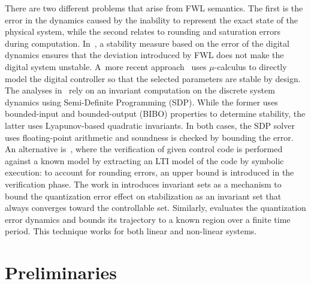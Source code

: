 \documentclass[twocolumn]{autart}    %
\renewcommand{\note}[1]{\textcolor{red}{[#1]}}
\begin{document}
There are two different problems that arise from FWL semantics.  The first
is the error in the dynamics caused by the inability to represent the exact
state of the physical system, while the second relates to rounding and
saturation errors during computation.  In~\cite{fialho1994stability}, a
stability measure based on the error of the digital dynamics ensures that
the deviation introduced by FWL does not make the digital system unstable. 
A~more recent approach~\cite{DBLP:journals/automatica/WuLCC09} uses
$\mu$-calculus to directly model the digital controller so that the selected
parameters are stable by design.  The analyses
in~\cite{DBLP:conf/hybrid/RouxJG15, DBLP:conf/hybrid/WangGRJF16} rely on an
invariant computation on the discrete system dynamics using Semi-Definite
Programming (SDP).  While the former uses bounded-input and bounded-output
(BIBO) properties to determine stability, the latter uses Lyapunov-based
quadratic invariants.  In both cases, the SDP solver uses floating-point
arithmetic and soundness is checked by bounding the error.  An alternative
is~\cite{park2016scalable}, where the verification of given control code is
performed against a known model by extracting an LTI model of the code by
symbolic execution: to account for rounding errors, an upper bound is
introduced in the verification phase.  The work in
\cite{picasso2003stabilization} introduces invariant sets as a mechanism to
bound the quantization error effect on stabilization as an invariant set
that always converges toward the controllable set.  Similarly,
\cite{liberzon2003hybrid} evaluates the quantization error dynamics and
bounds its trajectory to a known region over a finite time period.  This
technique works for both linear and non-linear systems.


\section{Preliminaries}
\label{sec:model}

\end{document}
